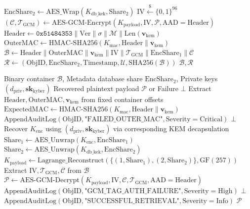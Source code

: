 \documentclass[sn-mathphys,Numbered]{sn-jnl}%
\theoremstyle{thmstyleone}%
\theoremstyle{thmstyletwo}%
\theoremstyle{thmstylethree}%
\begin{document}
\begin{algorithm}[!htbp]
\begin{algorithmic}[1]
\State $\text{EncShare}_2 \gets \text{AES\_Wrap}(K_{\text{db\_kek}}, \text{Share}_2)$
\State $\text{IV} \xleftarrow{\$} \{0, 1\}^{96}$
\State $(\mathcal{C}, \mathcal{T}_{\text{GCM}}) \gets \text{AES-GCM-Encrypt}(K_{\text{payload}}, \text{IV}, \mathcal{P}, \text{AAD}=\text{Header})$
\State $\text{Header} \gets \texttt{0x51484353} \parallel \text{Ver} \parallel \sigma \parallel \mathcal{M} \parallel \text{Len}(\mathbf{v}_{\text{kem}})$
\State $\text{OuterMAC} \gets \text{HMAC-SHA256}(K_{\text{mac}}, \text{Header} \parallel \mathbf{v}_{\text{kem}})$
\State $\mathcal{B} \gets \text{Header} \parallel \text{OuterMAC} \parallel \mathbf{v}_{\text{kem}} \parallel \text{IV} \parallel \mathcal{T}_{\text{GCM}} \parallel \text{EncShare}_1 \parallel \mathcal{C}$
\State $\mathcal{R} \gets (\text{ObjID}, \text{EncShare}_2, \text{Timestamp}, \mathcal{U}, \text{SHA256}(\mathcal{B}))$
\State \Return $\mathcal{B}, \mathcal{R}$
\end{algorithmic}
\end{algorithm}

\begin{algorithm}[!htbp]
\caption{Secure Retrieval, Outer HMAC Verification, and Key Reconstruction}
\label{alg:retrieval}
\begin{algorithmic}[1]
\Require Binary container $\mathcal{B}$, Metadata database share $\text{EncShare}_2$, Private keys $(d_{\text{priv}}, \mathbf{sk}_{\text{kyber}})$
\Ensure Recovered plaintext payload $\mathcal{P}$ or Failure $\bot$
\State Extract $\text{Header}, \text{OuterMAC}, \mathbf{v}_{\text{kem}}$ from fixed container offsets
\State $\text{ExpectedMAC} \gets \text{HMAC-SHA256}(K_{\text{mac}}, \text{Header} \parallel \mathbf{v}_{\text{kem}})$
    \State $\text{AppendAuditLog}(\text{ObjID}, \text{"FAILED\_OUTER\_MAC"}, \text{Severity}=\text{Critical})$
    \State \Return $\bot$ 
\EndIf
\State Recover $K_{\text{enc}}$ using $(d_{\text{priv}}, \mathbf{sk}_{\text{kyber}})$ via corresponding KEM decapsulation
\State $\text{Share}_1 \gets \text{AES\_Unwrap}(K_{\text{enc}}, \text{EncShare}_1)$
\State $\text{Share}_2 \gets \text{AES\_Unwrap}(K_{\text{db\_kek}}, \text{EncShare}_2)$
\State $K_{\text{payload}} \gets \text{Lagrange\_Reconstruct}(\{(1, \text{Share}_1), (2, \text{Share}_2)\}, \text{GF}(257))$
\State Extract $\text{IV}, \mathcal{T}_{\text{GCM}}, \mathcal{C}$ from $\mathcal{B}$
\State $\mathcal{P} \gets \text{AES-GCM-Decrypt}(K_{\text{payload}}, \text{IV}, \mathcal{C}, \mathcal{T}_{\text{GCM}}, \text{AAD}=\text{Header})$
    \State $\text{AppendAuditLog}(\text{ObjID}, \text{"GCM\_TAG\_AUTH\_FAILURE"}, \text{Severity}=\text{High})$
    \State \Return $\bot$
\EndIf
\State $\text{AppendAuditLog}(\text{ObjID}, \text{"SUCCESSFUL\_RETRIEVAL"}, \text{Severity}=\text{Info})$
\State \Return $\mathcal{P}$
\end{algorithmic}
\end{algorithm}
\end{document}
